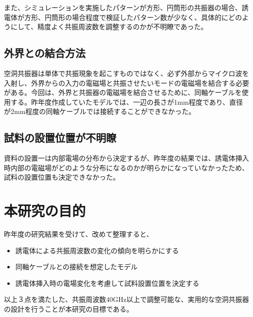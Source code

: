 また、シミュレーションを実施したパターンが方形、円筒形の共振器の場合、誘電体が方形、円筒形の場合程度で検証したパターン数が少なく、具体的にどのようにして、精度よく共振周波数を調整するのかが不明瞭であった。

\subsection*{外界との結合方法}
空洞共振器は単体で共振現象を起こすものではなく、必ず外部からマイクロ波を入射し、外界からの入力の電磁場と共振させたいモードの電磁場を結合する必要がある。今回は、外界と共振器の電磁場を結合させるために、同軸ケーブルを使用する。昨年度作成していたモデルでは、一辺の長さが1mm程度であり、直径が2mm程度の同軸ケーブルでは接続することができなかった。

\subsection*{試料の設置位置が不明瞭}
資料の設置一は内部電場の分布から決定するが、昨年度の結果では、誘電体挿入時内部の電磁場がどのような分布になるのかが明らかになっていなかったため、試料の設置位置も決定できなかった。

\section{本研究の目的}
昨年度の研究結果を受けて、改めて整理すると、

\begin{itemize}
  \item 誘電体による共振周波数の変化の傾向を明らかにする
  \item 同軸ケーブルとの接続を想定したモデル
  \item 誘電体挿入時の電場変化を考慮して試料設置位置を決定する
\end{itemize}

以上３点を満たした、共振周波数40GHz以上で調整可能な、実用的な空洞共振器の設計を行うことが本研究の目標である。
